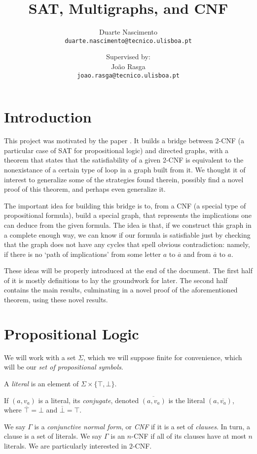 \documentclass[11pt]{article}
\title{SAT, Multigraphs, and CNF}
\author{Duarte Nascimento \\ \texttt{duarte.nascimento@tecnico.ulisboa.pt}
		\and Supervised by: \\ Jo\~ao Rasga \\ \texttt{joao.rasga@tecnico.ulisboa.pt}}
\date{}
\newcommand{\conj}[1]{\overline{#1}}
\begin{document}
\maketitle

\section{Introduction}

This project was motivated by the paper \cite{2cnf}. It builds a bridge between 2-CNF (a particular case of SAT for propositional logic) and directed graphs, with a theorem that states that the satisfiability of a given 2-CNF is equivalent to the nonexistance of a certain type of loop in a graph built from it. We thought it of interest to generalize some of the strategies found therein, possibly find a novel proof of this theorem, and perhaps even generalize it.

The important idea for building this bridge is to, from a CNF (a special type of propositional formula), build a special graph, that represents the implications one can deduce from the given formula. The idea is that, if we construct this graph in a complete enough way, we can know if our formula is satisfiable just by checking that the graph does not have any cycles that spell obvious contradiction: namely, if there is no `path of implications' from some letter $a$ to $\conj a$ and from $\conj a$ to $a$.

These ideas will be properly introduced at the end of the document. The first half of it is mostly definitions to lay the groundwork for later. The second half contains the main results, culminating in a novel proof of the aforementioned theorem, using these novel results.

\section{Propositional Logic}

We will work with a set $\Sigma$, which we will suppose finite for convenience, which will be our \emph{set of propositional symbols}.

A \emph{literal} is an element of $\Sigma \times \{\top, \bot\}$.

If $(a, v_a)$ is a literal, its \emph{conjugate}, denoted $\conj{(a,v_a)}$ is the literal $(a, \conj{v_a})$, where $\conj \top = \bot$ and $\conj \bot = \top$.

We say $\Gamma$ is a \emph{conjunctive normal form}, or \emph{CNF} if it is a set of \emph{clauses}. In turn, a clause is a set of literals. We say $\Gamma$ is an $n$-CNF if all of its clauses have at most $n$ literals. We are particularly interested in $2$-CNF.
\end{document}
